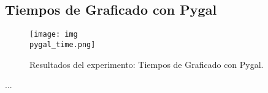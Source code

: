 \subsection{Tiempos de Graficado con Pygal}
\label{exp:pygal-time}

\begin{figure}[H]
    \centering
    \texttt{[image: img\\pygal\_time.png]}
    \caption{Resultados del experimento: Tiempos de Graficado con Pygal.}
    \label{fig:pygal-time}
\end{figure}

...
